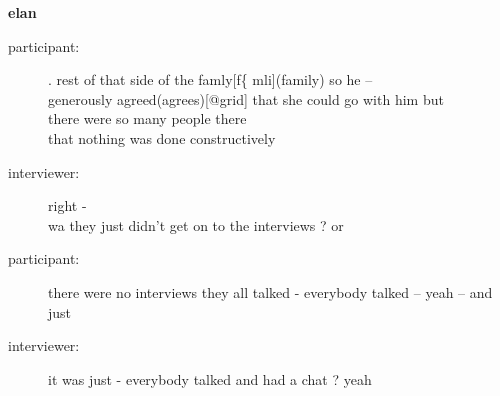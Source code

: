 \documentclass{article}
\newcommand{\turn}[2]{
\item[#1:] #2
}
\begin{document}
\begin{center}\textbf{elan}\end{center}

\begin{description}

\turn{participant}{. rest of that side of the famly[f\{ mli](family) so he --\\
generously agreed(agrees)[@grid] that she could go with him but\\
there were so many people there\\
that nothing was done constructively}

\turn{interviewer}{right -\\
wa they just didn't get on to the interviews ? or}

\turn{participant}{there were no interviews they all talked - everybody talked -- yeah -- and just}

\turn{interviewer}{it was just - everybody talked and had a chat ? yeah}


\end{description}
\end{document}
